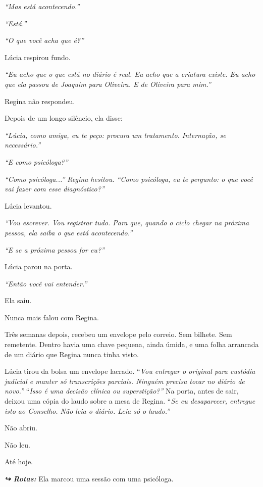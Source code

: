 \noindent \textit{\textquotedblleft{}Mas está acontecendo.\textquotedblright{}}

\noindent \textit{\textquotedblleft{}Está.\textquotedblright{}}

\noindent \textit{\textquotedblleft{}O que você acha que é?\textquotedblright{}}

\noindent Lúcia respirou fundo.

\noindent \textit{\textquotedblleft{}Eu acho que o que está no diário é real. Eu acho que a criatura existe. Eu acho que ela passou de Joaquim para Oliveira. E de Oliveira para mim.\textquotedblright{}}

\noindent Regina não respondeu.

\noindent Depois de um longo silêncio, ela disse:

\noindent \textit{\textquotedblleft{}Lúcia, como amiga, eu te peço: procura um tratamento. Internação, se necessário.\textquotedblright{}}

\noindent \textit{\textquotedblleft{}E como psicóloga?\textquotedblright{}}

\noindent \textit{\textquotedblleft{}Como psicóloga...\textquotedblright{}\textit{ Regina hesitou. }\textquotedblleft{}Como psicóloga, eu te pergunto: o que você vai fazer com esse diagnóstico?\textquotedblright{}}

\noindent Lúcia levantou.

\noindent \textit{\textquotedblleft{}Vou escrever. Vou registrar tudo. Para que, quando o ciclo chegar na próxima pessoa, ela saiba o que está acontecendo.\textquotedblright{}}

\noindent \textit{\textquotedblleft{}E se a próxima pessoa for eu?\textquotedblright{}}

\noindent Lúcia parou na porta.

\noindent \textit{\textquotedblleft{}Então você vai entender.\textquotedblright{}}

\noindent Ela saiu.

\noindent Nunca mais falou com Regina.

\noindent Três semanas depois, recebeu um envelope pelo correio. Sem bilhete. Sem remetente.
\noindent Dentro havia uma chave pequena, ainda úmida, e uma folha arrancada de um diário que Regina nunca tinha visto.

\noindent Lúcia tirou da bolsa um envelope lacrado.
\noindent \textquotedblleft{\textit{Vou entregar o original para custódia judicial e manter só transcrições parciais. Ninguém precisa tocar no diário de novo.\textquotedblright{}}}
\noindent \textquotedblleft{\textit{Isso é uma decisão clínica ou superstição?\textquotedblright{}}}
\noindent Na porta, antes de sair, deixou uma cópia do laudo sobre a mesa de Regina.
\noindent \textquotedblleft{\textit{Se eu desaparecer, entregue isto ao Conselho. Não leia o diário. Leia só o laudo.\textquotedblright{}}}

\noindent Não abriu.

\noindent Não leu.

\noindent Até hoje.

\vspace{0.5em}
\noindent\textit{\textbf{↪ Rotas:}  \rotasep {}}
\noindent Ela marcou uma sessão com uma psicóloga.